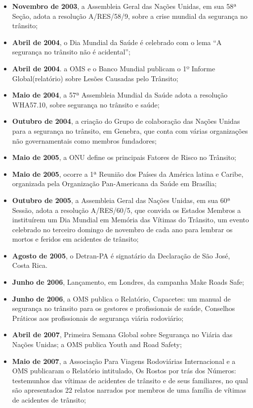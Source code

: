 \documentclass[output=paper,colorlinks,citecolor=green]{langscibook}
\begin{document}
\begin{itemize}
\item \textbf{Novembro de 2003}, a Assembleia Geral das Nações Unidas, em sua 58ª Seção, adota a resolução A/RES/58/9, sobre a crise mundial da segurança no trânsito;
\item \textbf{Abril de 2004}, o Dia Mundial da Saúde é celebrado com o lema “A segurança no trânsito não é acidental”; 
\item \textbf{Abril de 2004}. a OMS e o Banco Mundial publicam o 1º Informe Global(relatório) sobre Lesões Causadas pelo Trânsito;
\item \textbf{Maio de 2004}, a 57ª Assembleia Mundial da Saúde adota a resolução WHA57.10, sobre segurança no trânsito e saúde;
\item \textbf{Outubro de 2004}, a criação do Grupo de colaboração das Nações Unidas para a segurança no trânsito, em Genebra, que conta com várias organizações não governamentais como membros fundadores;
\item \textbf{Maio de 2005}, a ONU define os principais Fatores de Risco no Trânsito;
\item \textbf{Maio de 2005}, ocorre a 1ª Reunião dos Países da América latina e Caribe, organizada pela Organização Pan-Americana da Saúde em Brasília;
\item \textbf{Outubro de 2005}, a Assembleia Geral das Nações Unidas, em sua 60ª Sessão, adota a resolução A/RES/60/5, que convida os Estados Membros a instituírem um Dia Mundial em Memória das Vítimas do Trânsito, um evento celebrado no terceiro domingo de novembro de cada ano para lembrar os mortos e feridos em acidentes de trânsito;
\item \textbf{Agosto de 2005}, o Detran-PA é signatário da Declaração de São José, Costa Rica.
\item \textbf{Junho de 2006}, Lançamento, em Londres, da campanha Make Roads Safe;
\item \textbf{Junho de 2006}, a OMS publica o Relatório, Capacetes: um manual de segurança no trânsito para os gestores e profissionais de saúde, Conselhos Práticos aos profissionais de segurança viária rodoviário;
\item \textbf{Abril de 2007}, Primeira Semana Global sobre Segurança no Viária das Nações Unidas; a OMS publica Youth and Road Safety;
\item \textbf{Maio de 2007}, a Associação Para Viagens Rodoviárias Internacional e a OMS publicaram o Relatório intitulado, Os Rostos por trás dos Números: testemunhos das vítimas de acidentes de trânsito e de seus familiares, no qual são apresentados 22 relatos narrados por membros de uma família de vítimas de acidentes de trânsito;

\end{itemize}
\end{document}
